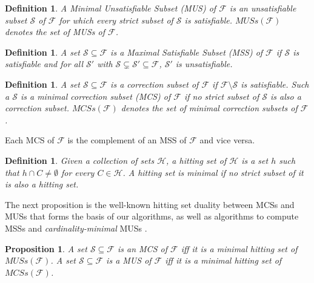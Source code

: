 \documentclass[twoside,11pt]{article}
\newcommand\m[1]{\mathcal{#1}}
\newtheorem{definition}[thm]{Definition}
\newtheorem{property}[prop]{Property}
\newtheorem{proposition}[propo]{Proposition}
\newcommand\F{\ensuremath{\m{F} }\xspace}
\newcommand\formula{\ensuremath{\m{F} }\xspace}
\newcommand\muses[1]{\ensuremath{\mathit{MUSs}(#1)}\xspace}
\newcommand\mcses[1]{\ensuremath{\mathit{MCSs}(#1)}\xspace}
\begin{document}
\begin{definition}
A \emph{Minimal Unsatisfiable Subset} (MUS) of 
\F is an unsatisfiable subset $\m{S}$ of $\F$ for which every strict subset of $\m{S} $ is satisfiable. 
\muses{\F} denotes the set of MUSs of \F. 
\end{definition}

\begin{definition}
A set $\m{S} \subseteq \formula$ is a \emph{Maximal Satisfiable Subset} (MSS) of $ \formula$ if $\m{S}$ is satisfiable and for all $\m{S}'$ with $\m{S}  \subsetneq  \m{S}'\subseteq\formula $, $\m{S}'$ is unsatisfiable.
\end{definition}

\begin{definition}
A set $\m{S} \subseteq \formula$ is a \emph{correction subset} of \formula if $\formula\setminus\m{S}$ is satisfiable. 
Such a $\m{S}$ is a \emph{minimal correction subset} (MCS)  of \formula if no strict subset of $\m{S}$ is also a correction subset. 
\mcses{\F} denotes the set of minimal correction subsets of \F. 
\end{definition}
Each  MCS of \formula is the complement of an MSS of \formula and vice versa. 	

\begin{definition}\label{def:minimal-hs}
Given a collection of sets $\m{H}$, a hitting set of $\m{H}$ is a set $h$ such that  $h \cap C \neq \emptyset$ for every $C \in \m{H}$. A hitting set is \emph{minimal} if no strict subset of it is also a hitting set.

\end{definition}

The next proposition is the well-known hitting set duality \cite{DBLP:journals/jar/LiffitonS08,ai/Reiter87}  between MCSs and MUSs that forms the basis of our algorithms, as well as algorithms to compute MSSs \cite{DBLP:conf/sat/DaviesB13} and \emph{cardinality-minimal} MUSs \cite{ignatiev2015smallest}.

\begin{proposition}\label{prop:MCS-MUS-hittingset}
A set  $\m{S} \subseteq \formula$ is an MCS of $ \formula$ iff it is a \emph{minimal hitting set} of \muses{\formula}.
A set  $\m{S} \subseteq \formula$ is a MUS of $ \formula$ iff it is a \emph{minimal hitting set} of \mcses{\formula}.
\end{proposition}
\end{document}
